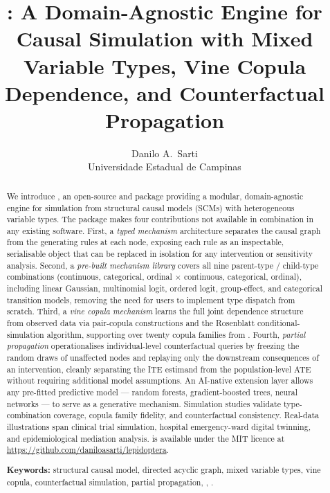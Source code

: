 \documentclass[article]{jss}
\title{\pkg{lepidoptera}: A Domain-Agnostic Engine for Causal Simulation
  with Mixed Variable Types, Vine Copula Dependence,
  and Counterfactual Propagation}
\author{Danilo A.~Sarti\\
        Universidade Estadual de Campinas}
\begin{document}
\maketitle

\begin{abstract}
\noindent
We introduce , an open-source  and 
package providing a modular, domain-agnostic engine for simulation from structural
causal models (SCMs) with heterogeneous variable types. The package makes four
contributions not available in combination in any existing software. First, a
\emph{typed mechanism} architecture separates the causal graph from the generating
rules at each node, exposing each rule as an inspectable, serialisable
 object that can be replaced in isolation for any intervention or
sensitivity analysis. Second, a \emph{pre-built mechanism library} covers all nine
parent-type / child-type combinations (continuous, categorical, ordinal $\times$
continuous, categorical, ordinal), including linear Gaussian, multinomial logit,
ordered logit, group-effect, and categorical transition models, removing the need
for users to implement type dispatch from scratch. Third, a \emph{vine copula
mechanism} learns the full joint dependence structure from observed data via
pair-copula constructions and the Rosenblatt conditional-simulation algorithm,
supporting over twenty copula families from 
\citep{nagler2022rvinecopulib}. Fourth, \emph{partial propagation} operationalises
individual-level counterfactual queries by freezing the random draws of unaffected
nodes and replaying only the downstream consequences of an intervention, cleanly
separating the ITE estimand from the population-level ATE without requiring
additional model assumptions. An AI-native extension layer allows any pre-fitted
predictive model --- random forests, gradient-boosted trees, neural networks --- to
serve as a generative mechanism. Simulation studies validate type-combination
coverage, copula family fidelity, and counterfactual consistency. Real-data
illustrations span clinical trial simulation, hospital emergency-ward digital
twinning, and epidemiological mediation analysis.  is available
under the MIT licence at \url{https://github.com/daniloasarti/lepidoptera}.

\medskip\noindent
\textbf{Keywords:} structural causal model, directed acyclic graph, mixed variable
types, vine copula, counterfactual simulation, partial propagation,
, .
\end{abstract}
\end{document}
